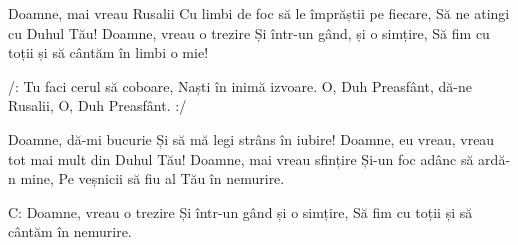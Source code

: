 
\beginverse
Doamne, mai vreau Rusalii
Cu limbi de foc să le împrăștii pe fiecare,
Să ne atingi cu Duhul Tău!
Doamne, vreau o trezire
Și într-un gând, și o simțire,
Să fim cu toții și să cântăm în limbi o mie!
\endverse

\beginchorus
/: Tu faci cerul să coboare,
Naști în inimă izvoare.
O, Duh Preasfânt, dă-ne Rusalii,
O, Duh Preasfânt. :/
\endchorus

\beginverse
Doamne, dă-mi bucurie
Și să mă legi strâns în iubire!
Doamne, eu vreau, vreau tot mai mult din Duhul Tău!
Doamne, mai vreau sfințire
Și-un foc adânc să ardă-n mine,
Pe veșnicii să fiu al Tău în nemurire.
\endverse

\beginverse
C: Doamne, vreau o trezire
Și într-un gând și o simțire,
Să fim cu toții și să cântăm în nemurire.
\endverse

\endsong